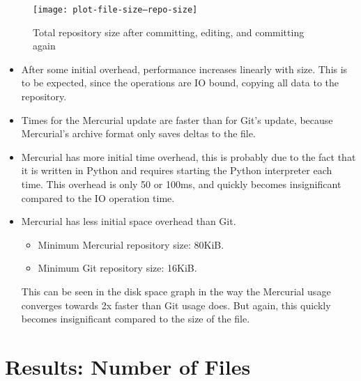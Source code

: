 \begin{figure}[]
  \caption{Total repository size after committing, editing, and committing again}
  \label{fig:plot-file-size--repo-size}
  \centering
    \texttt{[image: plot-file-size--repo-size]}
\end{figure}


\begin{itemize}

    \item After some initial overhead, performance increases linearly with size.
        This is to be expected, since the operations are IO bound, copying all
        data to the repository.

    \item Times for the Mercurial update are faster than for Git's update,
        because Mercurial's archive format only saves deltas to the file.

    \item Mercurial has more initial time overhead, this is probably due to the
        fact that it is written in Python and requires starting the Python
        interpreter each time. This overhead is only 50 or 100ms, and quickly
        becomes insignificant compared to the IO operation time.

    \item Mercurial has less initial space overhead than Git.

        \begin{itemize}
            \setlength{\itemsep}{0pt}
            \setlength{\parskip}{0pt}
            \setlength{\parsep}{0pt}
            \item Minimum Mercurial repository size: 80KiB.
            \item Minimum Git repository size: 16KiB.
        \end{itemize}

        This can be seen in the disk space graph in the way the Mercurial usage
        converges towards 2x faster than Git usage does. But again, this quickly
        becomes insignificant compared to the size of the file.

\end{itemize}

%



\section{Results: Number of Files}


